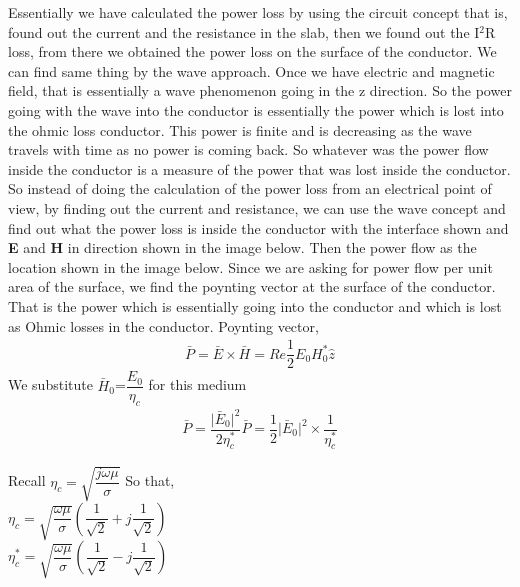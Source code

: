 Essentially we have calculated the power loss by using the circuit concept that is, found out the current and the resistance in the slab, then we found out the I$^{2}$R loss, from there we obtained the power loss on the surface of the conductor. We can find same thing by the wave approach. Once we have electric and magnetic field, that is essentially a wave phenomenon going in the z direction. So the power going with the wave into the conductor is essentially the power which is lost into the ohmic loss conductor. This power is finite and is decreasing as the wave travels with time as no power is coming back. So whatever was the power flow inside the conductor is a measure of the power that was lost inside the conductor. So instead of doing the calculation of the power loss from an electrical point of view, by finding out the current and resistance, we can use the wave concept and find out what the power loss is inside the conductor with the interface shown and \textbf{E} and \textbf{H} in direction shown in the image below. Then the power flow as the location shown in the image below. Since we are asking for power flow per unit area of the surface, we find the poynting vector at the surface of the conductor. That is the power which is essentially going into the conductor and which is lost as Ohmic losses in the conductor.
Poynting vector,
\begin{align}
\bar{P}=\bar{E}\times \bar{H}=Re\dfrac{1}{2}E_{0}H_{0}^{\ast}\hat{z}
\end{align}
We substitute $\bar{H}$$_{0}$=$\dfrac{E_{0}}{\eta_{c}}$ for this medium
\begin{align}
\bar{P}=\dfrac{\lvert\bar{E}_{0}\rvert^{2}}{2\eta_{c}^{\ast}}
\bar{P}=\dfrac{1}{2}\lvert\bar{E}_{0}\rvert^{2}\times \dfrac{1}{\eta_{c}^{\ast}}
\end{align}

Recall  $\eta_{c}=\sqrt{\dfrac{j\omega\mu}{\sigma}}$
So that,\\
$\eta_{c}=\sqrt{\dfrac{\omega\mu}{\sigma}}(\dfrac{1}{\sqrt{2}}+j\dfrac{1}{\sqrt{2}})$\\
$\eta_{c}^{\ast}=\sqrt{\dfrac{\omega\mu}{\sigma}}(\dfrac{1}{\sqrt{2}}-j\dfrac{1}{\sqrt{2}})$\\

